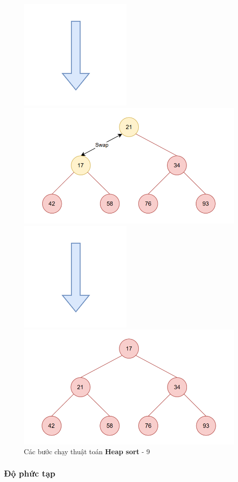 \begin{figure}[H]
    \centering
    \includegraphics[width=0.1\linewidth]{img/heap_sort/arrow.png}
    \vspace{0.5cm}

    \includegraphics[width=0.5\linewidth]{img/heap_sort/22.png}
    \vspace{0.5cm}

    \includegraphics[width=0.1\linewidth]{img/heap_sort/arrow.png}
    \vspace{0.5cm}

    \includegraphics[width=0.5\linewidth]{img/heap_sort/23.png}

    \caption{Các bước chạy thuật toán \textbf{Heap sort} - 9}
\end{figure}
\subsubsection{Độ phức tạp}


